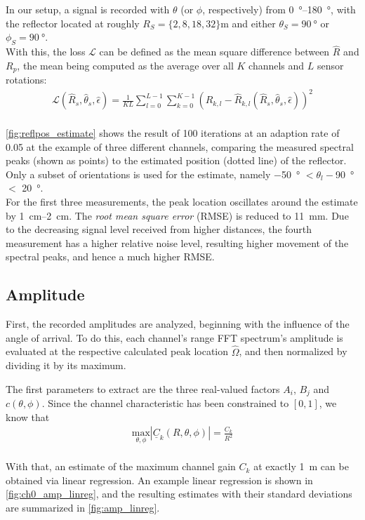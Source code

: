In our setup, a signal is recorded with $\theta$ (or $\phi$, respectively) from \SIrange{0}{180}{\degree},
with the reflector located at roughly $R_S = \{2,8,18,32\}\si{\meter}$ and either $\theta_S = \SI{90}{\degree}$ or $\phi_S = \SI{90}{\degree}$. \\

With this, the loss $\mathcal L$ can be defined as the mean square difference between $\hat R$ and $R_{p}$,
the mean being computed as the average over all $K$ channels and $L$ sensor rotations:
\begin{align}
    \mathcal L(\hat R_s, \hat \theta_s, \hat \epsilon)
    = \frac{1}{KL}\sum_{l=0}^{L-1} \sum_{k=0}^{K-1} ( R_{k,l} - \hat  R_{k,l}(\hat R_s, \hat \theta_s, \hat \epsilon))^2
\end{align} \\

\autoref{fig:reflpos_estimate} shows the result of 100 iterations at an adaption rate of 0.05 at the example of three different channels,
comparing the measured spectral peaks (shown as points) to the estimated position (dotted line) of the reflector.
Only a subset of orientations is used for the estimate,
namely \SI{-50}{\degree} $<\theta_l-$\SI{90}{\degree}$<$ \SI{20}{\degree}. \\

For the first three measurements, the peak location oscillates around the estimate by \SIrange[range-units=single]{1}{2}{\cm}.
The \emph{root mean square error} (RMSE) is reduced to \SI{11}{\mm}.
Due to the decreasing signal level received from higher distances, 
the fourth measurement has a higher relative noise level, resulting higher movement of the spectral peaks, and hence a much higher RMSE.

\subsection{Amplitude}
\label{sec:amplitude}
First, the recorded amplitudes are analyzed, beginning with the influence of the angle of arrival.
To do this, each channel's range FFT spectrum's amplitude is evaluated at the respective calculated peak location $\hat \Omega$,
and then normalized by dividing it by its maximum.

The first parameters to extract are the three real-valued factors $A_i$, $B_j$ and $c(\theta,\phi)$.
Since the channel characteristic has been constrained to $[0,1]$, we know that
\begin{align}
    \underset{\theta,\phi}{\text{max}} |\underline C_k(R,\theta,\phi)|  = \frac{C_k}{R^2} \label{eq:max_G}
\end{align} \\
With that, an estimate of the maximum channel gain $C_k$ at exactly \SI{1}{\meter} can be obtained via linear regression.
An example linear regression is shown in \autoref{fig:ch0_amp_linreg},
and the resulting estimates with their standard deviations are summarized in \autoref{fig:amp_linreg}. \\

